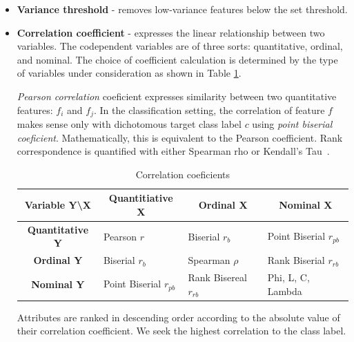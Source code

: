 \begin{itemize}
\item \textbf{Variance threshold} - removes low-variance features below the set threshold.

\item \textbf{Correlation coefficient} - expresses the linear relationship between two variables. The codependent variables are of three sorts: quantitative, ordinal, and nominal. The choice of coefficient calculation is determined by the type of variables under consideration as shown in Table \ref{tab:corr-coef}. 


\emph{Pearson correlation} coeficient expresses similarity between two quantitative features: $f_i$ and $f_j$. In the classification setting, the correlation of feature $f$ makes sense only with dichotomous target class label $c$ using \emph{point biserial coeficient}. Mathematically, this is equivalent to the Pearson coefficient. Rank correspondence is quantified with either Spearman rho or Kendall's Tau~\cite{calkins_more_2005}.

\begin{table}[ht]
\renewcommand{\arraystretch}{1.5}
\begin{adjustbox}{width=\columnwidth,center}
\begin{tabular}{|c|l|l|l|}
\hline
\textbf{Variable Y\textbackslash{}X} & \multicolumn{1}{c|}{\textbf{Quantitiative X}} & \multicolumn{1}{c|}{\textbf{Ordinal X}} & \multicolumn{1}{c|}{\textbf{Nominal X}} \\ \hline
\textbf{Quantitative Y}              & Pearson $r$                                   & Biserial $r_b$                          & Point Biserial $r_{pb}$                 \\ \hline
\textbf{Ordinal Y}                   & Biserial $r_b$                                & Spearman $\rho$    & Rank Biserial $r_{rb}$                  \\ \hline
\textbf{Nominal Y}                   & Point Biserial $r_{pb}$                       & Rank Bisereal $r_{rb}$                  & Phi, L, C, Lambda                       \\ \hline
\end{tabular}
\end{adjustbox}
\caption{Correlation coeficients}
\label{tab:corr-coef}
\end{table}

Attributes are ranked in descending order according to the absolute value of their correlation coefficient. We seek the highest correlation to the class label.


\end{itemize}
